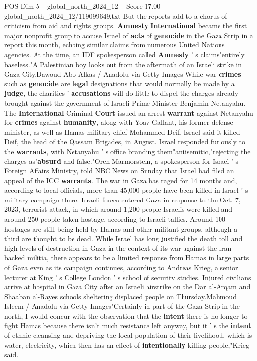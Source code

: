 \begin{textsample}{POS Dim 5 – global\_north\_2024\_12 – Score 17.00 – global\_north\_2024\_12/119099649.txt}
But the reports add to a chorus of criticism from aid and rights groups. \textbf{Amnesty} \textbf{International} became the first major nonprofit group to accuse Israel of \textbf{acts} of \textbf{genocide} in the Gaza Strip in a report this month, echoing similar claims from numerous United Nations agencies.
At the time, an IDF spokesperson called \textbf{Amnesty} ' s claims"entirely baseless."A Palestinian boy looks out from the aftermath of an Israeli strike in Gaza City.Dawoud Abo Alkas / Anadolu via Getty Images While war \textbf{crimes} such as \textbf{genocide} are \textbf{legal} designations that would normally be made by a \textbf{judge}, the charities ' \textbf{accusations} will do little to dispel the charges already brought against the government of Israeli Prime Minister Benjamin Netanyahu.
The \textbf{International} Criminal \textbf{Court} issued an arrest \textbf{warrant} against Netanyahu for \textbf{crimes} against \textbf{humanity}, along with Yoav Gallant, his former defense minister, as well as Hamas military chief Mohammed Deif.
Israel said it killed Deif, the head of the Qassam Brigades, in August.
Israel responded furiously to the \textbf{warrants}, with Netanyahu ' s office branding them"antisemitic,"rejecting the charges as"\textbf{absurd} and false."Oren Marmorstein, a spokesperson for Israel ' s Foreign Affairs Ministry, told NBC News on Sunday that Israel had filed an appeal of the ICC \textbf{warrants}.
The war in Gaza has raged for 14 months and, according to local officials, more than 45,000 people have been killed in Israel ' s military campaign there.
Israeli forces entered Gaza in response to the Oct. 7, 2023, terrorist attack, in which around 1,200 people Israelis were killed and around 250 people taken hostage, according to Israeli tallies.
Around 100 hostages are still being held by Hamas and other militant groups, although a third are thought to be dead.
While Israel has long justified the death toll and high levels of destruction in Gaza in the context of its war against the Iran-backed militia, there appears to be a limited response from Hamas in large parts of Gaza even as its campaign continues, according to Andreas Krieg, a senior lecturer at King ' s College London ' s school of security studies.
Injured civilians arrive at hospital in Gaza City after an Israeli airstrike on the Dar al-Arqam and Shaaban al-Rayes schools sheltering displaced people on Thursday.Mahmoud Isleem / Anadolu via Getty Images"Certainly in part of the Gaza Strip in the north, I would concur with the observation that the \textbf{intent} there is no longer to fight Hamas because there isn't much resistance left anyway, but it ' s the \textbf{intent} of ethnic cleansing and depriving the local population of their livelihood, which is water, electricity, which then has an effect of \textbf{intentionally} killing people,"Krieg said.

\end{textsample}
